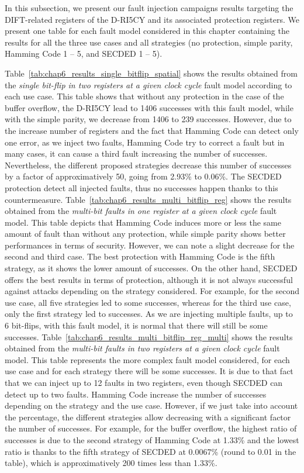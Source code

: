 In this subsection, we present our fault injection campaigns results targeting the DIFT-related registers of the D-RI5CY and its associated protection registers. We present one table for each fault model considered in this chapter containing the results for all the three use cases and all strategies (no protection, simple parity, Hamming Code 1 -- 5, and SECDED 1 -- 5).

Table~\ref{tab:chap6_results_single_bitflip_spatial} shows the results obtained from the \textit{single bit-flip in two registers at a given clock cycle} fault model according to each use case. This table shows that without any protection in the case of the buffer overflow, the D-RI5CY lead to 1406 successes with this fault model, while with the simple parity, we decrease from 1406 to 239 successes. However, due to the increase number of registers and the fact that Hamming Code can detect only one error, as we inject two faults, Hamming Code try to correct a fault but in many cases, it can cause a third fault increasing the number of successes. Nevertheless, the different proposed strategies decrease this number of successes by a factor of approximatively 50, going from 2.93\% to 0.06\%. The SECDED protection detect all injected faults, thus no successes happen thanks to this countermeasure.
Table~\ref{tab:chap6_results_multi_bitflip_reg} shows the results obtained from the \textit{multi-bit faults in one register at a given clock cycle} fault model. This table depicts that Hamming Code induces more or less the same amount of fault than without any protection, while simple parity shows better performances in terms of security. However, we can note a slight decrease for the second and third case. The best protection with Hamming Code is the fifth strategy, as it shows the lower amount of successes. On the other hand, SECDED offers the best results in terms of protection, although it is not always successful against attacks depending on the strategy considered. For example, for the second use case, all five strategies led to some successes, whereas for the third use case, only the first strategy led to successes. As we are injecting multiple faults, up to 6 bit-flips, with this fault model, it is normal that there will still be some successes.
Table~\ref{tab:chap6_results_multi_bitflip_reg_multi} shows the results obtained from the \textit{multi-bit faults in two registers at a given clock cycle} fault model. This table represents the more complex fault model considered, for each use case and for each strategy there will be some successes. It is due to that fact that we can inject up to 12 faults in two registers, even though SECDED can detect up to two faults. Hamming Code increase the number of successes depending on the strategy and the use case. However, if we just take into account the percentage, the different strategies allow decreasing with a significant factor the number of successes. For example, for the buffer overflow, the highest ratio of successes is due to the second strategy of Hamming Code at 1.33\% and the lowest ratio is thanks to the fifth strategy of SECDED at 0.0067\% (round to 0.01 in the table), which is approximatively 200 times less than 1.33\%.

